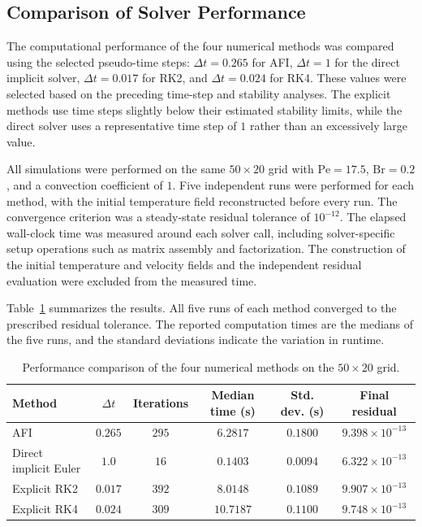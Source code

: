 \subsection{Comparison of Solver Performance}

The computational performance of the four numerical methods
was compared using the selected pseudo-time steps:
$\Delta t=0.265$ for AFI, $\Delta t=1$ for the direct
implicit solver, $\Delta t=0.017$ for RK2, and
$\Delta t=0.024$ for RK4. These values were selected based
on the preceding time-step and stability analyses. The
explicit methods use time steps slightly below their
estimated stability limits, while the direct solver uses
a representative time step of $1$ rather than an
excessively large value.

All simulations were performed on the same $50\times20$
grid with $\mathrm{Pe}=17.5$, $\mathrm{Br}=0.2$, and a
convection coefficient of $1$. Five independent runs
were performed for each method, with the initial
temperature field reconstructed before every run. The
convergence criterion was a steady-state residual
tolerance of $10^{-12}$. The elapsed wall-clock time was
measured around each solver call, including solver-specific
setup operations such as matrix assembly and factorization.
The construction of the initial temperature and velocity
fields and the independent residual evaluation were
excluded from the measured time.

Table~\ref{tab:solver_comparison} summarizes the results.
All five runs of each method converged to the prescribed
residual tolerance. The reported computation times are
the medians of the five runs, and the standard deviations
indicate the variation in runtime.

\begin{table}[htbp]
    \centering
    \small
    \caption{Performance comparison of the four numerical
    methods on the $50\times20$ grid.}
    \label{tab:solver_comparison}
    \begin{tabular}{@{}l c c c c c@{}}
        \hline
        Method
        & $\Delta t$
        & Iterations
        & Median time (s)
        & Std. dev. (s)
        & Final residual
        \\
        \hline
        AFI
        & $0.265$
        & $295$
        & $6.2817$
        & $0.1800$
        & $9.398\times10^{-13}$
        \\[0.1cm]
        Direct implicit Euler
        & $1.0$
        & $16$
        & $0.1403$
        & $0.0094$
        & $6.322\times10^{-13}$
        \\[0.1cm]
        Explicit RK2
        & $0.017$
        & $392$
        & $8.0148$
        & $0.1089$
        & $9.907\times10^{-13}$
        \\[0.1cm]
        Explicit RK4
        & $0.024$
        & $309$
        & $10.7187$
        & $0.1100$
        & $9.748\times10^{-13}$
        \\
        \hline
    \end{tabular}
\end{table}

